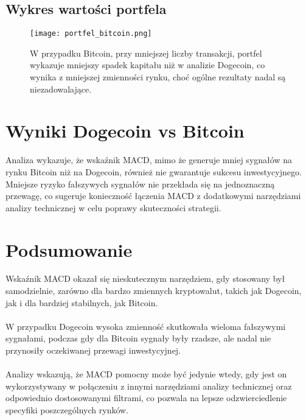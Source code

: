 \documentclass[a4paper,12pt]{article}
\begin{document}
\subsection{Wykres wartości portfela}
\begin{figure}[H]
  \centering
  \texttt{[image: portfel\_bitcoin.png]}
  \par\vspace{0.5em}
  \parbox{0.9\textwidth}{\centering\small W przypadku Bitcoin, przy mniejszej liczby transakcji, portfel wykazuje mniejszy spadek kapitału niż w analizie Dogecoin, co wynika z mniejszej zmienności rynku, choć ogólne rezultaty nadal są niezadowalające.}
\end{figure}
\paragraph{}

\section{Wyniki Dogecoin vs Bitcoin}
Analiza wykazuje, że wskaźnik MACD, mimo że generuje mniej sygnałów na rynku Bitcoin niż na
Dogecoin, również nie gwarantuje sukcesu inwestycyjnego. Mniejsze ryzyko fałszywych sygnałów nie
przekłada się na jednoznaczną przewagę, co sugeruje konieczność łączenia MACD z dodatkowymi
narzędziami analizy technicznej w celu poprawy skuteczności strategii.

\section{Podsumowanie}
Wskaźnik MACD okazał się nieskutecznym narzędziem, gdy stosowany był samodzielnie, zarówno dla
bardzo zmiennych kryptowalut, takich jak Dogecoin, jak i dla bardziej stabilnych, jak Bitcoin. \\\\
W przypadku Dogecoin wysoka zmienność skutkowała wieloma fałszywymi sygnałami, podczas gdy dla
Bitcoin sygnały były rzadsze, ale nadal nie przynosiły oczekiwanej przewagi inwestycyjnej.  \\\\
Analizy wskazują, że MACD pomocny może być jedynie wtedy, gdy jest on wykorzystywany w połączeniu z
innymi narzędziami analizy technicznej oraz odpowiednio dostosowanymi filtrami, co pozwala na lepsze
odzwierciedlenie specyfiki poszczególnych rynków.
\end{document}
